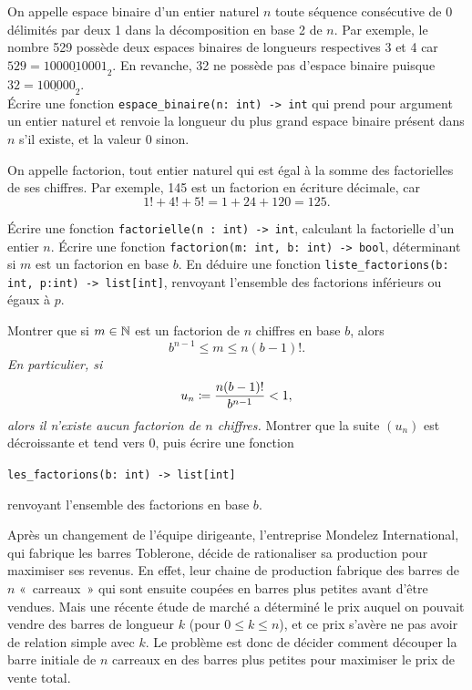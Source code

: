 \documentclass{magnolia}
\begin{document}
On appelle espace binaire d'un entier naturel $n$ toute séquence consécutive de 0 délimités
par deux 1 dans la décomposition en base 2 de $n$. Par exemple, le nombre 529 possède deux
espaces binaires de longueurs respectives 3 et 4 car $529=\underline{1000010001}_2$. En revanche, 32 ne
possède pas d'espace binaire puisque $32=\underline{100000}_2$.\\

Écrire une fonction \verb!espace_binaire(n: int) -> int! qui prend pour argument un entier naturel
et renvoie la longueur du plus grand espace binaire présent dans $n$ s'il existe, et la valeur
0 sinon.


On appelle factorion, tout entier naturel qui est égal à la somme des factorielles de
ses chiffres. Par exemple, 145 est un factorion en écriture décimale, car
\[1! + 4! + 5! = 1 + 24 + 120 = 125.\]
\begin{questions}
\question Écrire une fonction \verb!factorielle(n : int) -> int!, calculant la
  factorielle d'un entier $n$.
\question Écrire une fonction \verb!factorion(m: int, b: int) -> bool!, déterminant
  si $m$ est un factorion en base $b$.
\question En déduire une fonction \verb!liste_factorions(b: int, p:int) -> list[int]!,
  renvoyant l'ensemble des factorions inférieurs ou égaux à $p$. 
\question
\begin{questions}
\question Montrer que si $m\in\mathbb{N}$ est un factorion de $n$ chiffres en base $b$, alors
  \[b^{n-1} \leq m \leq n(b-1)!.\]
\emph{En particulier, si
  \[u_n \coloneqq \frac{n(b-1)!}{b^{n-1}}<1,\]
  alors il n'existe aucun factorion de $n$ chiffres.}
\question Montrer que la suite $(u_n)$ est décroissante et tend vers 0,
  puis écrire une fonction
\begin{center}
  \verb!les_factorions(b: int) -> list[int]!
\end{center}
  renvoyant l'ensemble des factorions en base $b$.
\end{questions}
\end{questions}

Après un changement de l'équipe dirigeante, l'entreprise Mondelez
International, qui fabrique les barres Toblerone, décide de rationaliser
sa production pour maximiser ses revenus. En effet, leur chaine de production
fabrique des barres de $n$ «~carreaux~» qui sont ensuite coupées en barres plus
petites avant d'être vendues. Mais une récente étude de marché a déterminé le
prix auquel on pouvait vendre des barres de longueur $k$ (pour
$0 \leq k \leq n$), et ce prix s'avère ne pas avoir de relation simple avec $k$.
Le problème est donc de décider comment découper la barre initiale de $n$
carreaux en des barres plus petites pour maximiser le prix de vente total.\\
\end{document}
